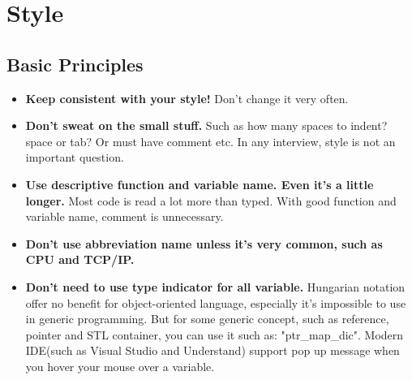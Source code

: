 \documentclass[a4paper,11pt,twoside]{book}
\begin{document}
\section{Style}
\subsection{Basic Principles}
\begin{itemize}
	\item \textbf{Keep consistent with your style!} Don't change it very often.
	
	\item \textbf{Don't sweat on the small stuff.} Such as how many spaces to indent? space or tab? Or must have comment etc. In any interview, style is not an important question.
	
	\item \textbf{Use descriptive function and variable name. Even it's a little longer.} Most code is read a lot more than typed. With good function and variable name, comment is unnecessary.
	
	\item \textbf{Don't use abbreviation name unless it's very common, such as CPU and TCP/IP.}
	
	\item \textbf{Don't need to use type indicator for all variable.} Hungarian notation offer no benefit for object-oriented language, especially it's impossible to use in generic programming. But for some generic concept, such as reference, pointer and STL container, you can use it such as: "ptr\_map\_dic". Modern IDE(such as Visual Studio and Understand) support pop up message when you hover your mouse over a variable.
\end{itemize}
\end{document}
